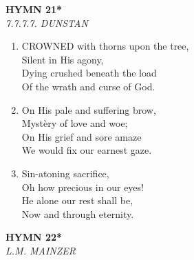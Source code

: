 \documentclass[11pt,a4paper]{article}
\begin{document}
\newpage
\begin{center}
    {\Large \textbf{HYMN 21*}}
    \\
    \textit{7.7.7.7. DUNSTAN}
\end{center}
\vspace{1em}

\begin{enumerate}
    \item CROWNED with thorns upon the tree, \\
        Silent in His agony, \\
        Dying crushed beneath the load \\
        Of the wrath and curse of God.

    \item On His pale and suffering brow, \\
        Myst\`ery of love and woe; \\
        On His grief and sore amaze \\
        We would fix our earnest gaze.

    \item Sin-atoning sacrifice, \\
        Oh how precious in our eyes! \\
        He alone our rest shall be, \\
        Now and through eternity.

\end{enumerate}

\newpage
\begin{center}
    {\Large \textbf{HYMN 22*}}
    \\
    \textit{L.M. MAINZER}
\end{center}
\vspace{1em}
\end{document}

